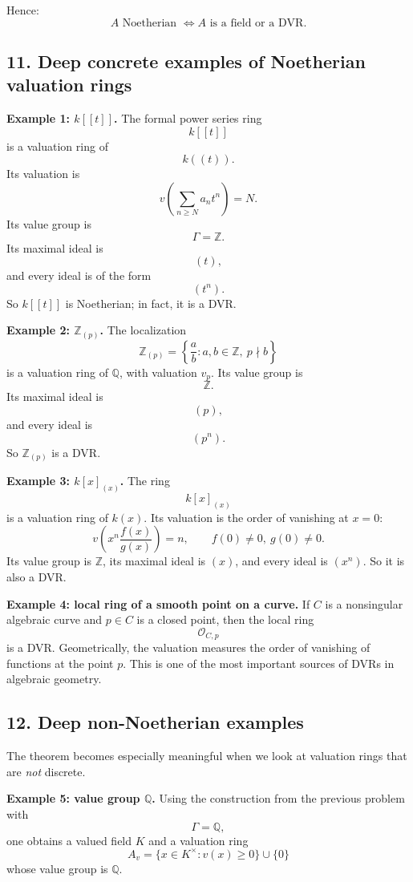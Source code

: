 \documentclass[12pt,a4paper]{article}
\theoremstyle{notespace}
\begin{document}
Hence:
\[
A \text{ Noetherian }
\iff
A \text{ is a field or a DVR.}
\]

\subsection{11. Deep concrete examples of Noetherian valuation rings}

\textbf{Example 1: \(k[[t]]\).}
The formal power series ring
\[
k[[t]]
\]
is a valuation ring of
\[
k((t)).
\]
Its valuation is
\[
v\!\left(\sum_{n\ge N} a_n t^n\right)=N.
\]
Its value group is
\[
\Gamma=\mathbb Z.
\]
Its maximal ideal is
\[
(t),
\]
and every ideal is of the form
\[
(t^n).
\]
So \(k[[t]]\) is Noetherian; in fact, it is a DVR.

\medskip

\textbf{Example 2: \(\mathbb Z_{(p)}\).}
The localization
\[
\mathbb Z_{(p)}=\left\{\frac ab : a,b\in \mathbb Z,\ p\nmid b\right\}
\]
is a valuation ring of \(\mathbb Q\), with valuation \(v_p\). Its value group is
\[
\mathbb Z.
\]
Its maximal ideal is
\[
(p),
\]
and every ideal is
\[
(p^n).
\]
So \(\mathbb Z_{(p)}\) is a DVR.

\medskip

\textbf{Example 3: \(k[x]_{(x)}\).}
The ring
\[
k[x]_{(x)}
\]
is a valuation ring of \(k(x)\). Its valuation is the order of vanishing at \(x=0\):
\[
v\!\left(x^n\frac{f(x)}{g(x)}\right)=n,
\qquad
f(0)\neq 0,\ g(0)\neq 0.
\]
Its value group is \(\mathbb Z\), its maximal ideal is \((x)\), and every ideal is \((x^n)\). So it is also a DVR.

\medskip

\textbf{Example 4: local ring of a smooth point on a curve.}
If \(C\) is a nonsingular algebraic curve and \(p\in C\) is a closed point, then the local ring
\[
\mathcal O_{C,p}
\]
is a DVR. Geometrically, the valuation measures the order of vanishing of functions at the point \(p\). This is one of the most important sources of DVRs in algebraic geometry.

\subsection{12. Deep non-Noetherian examples}

The theorem becomes especially meaningful when we look at valuation rings that are \emph{not} discrete.

\medskip

\textbf{Example 5: value group \(\mathbb Q\).}
Using the construction from the previous problem with
\[
\Gamma=\mathbb Q,
\]
one obtains a valued field \(K\) and a valuation ring
\[
A_v=\{x\in K^\times : v(x)\ge 0\}\cup\{0\}
\]
whose value group is \(\mathbb Q\).
\end{document}
